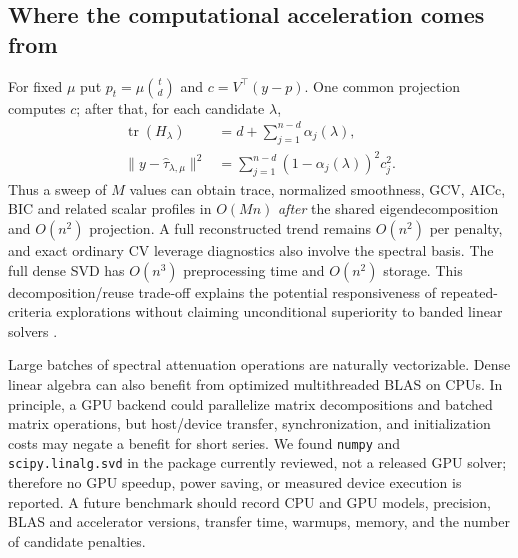 \subsection{Where the computational acceleration comes from}
For fixed $\mu$ put $p_t=\mu\binom td$ and
$c=V^\top(y-p)$. One common projection computes $c$; after
that, for each candidate $\lambda$,
\begin{align}\label{eq:fast-profiles}
\operatorname{tr}(H_\lambda)&=d+\sum_{j=1}^{n-d}\alpha_j(\lambda),\\
\|y-\widehat{\tau}_{\lambda,\mu}\|^2
&=\sum_{j=1}^{n-d}(1-\alpha_j(\lambda))^2c_j^2.
\end{align}
Thus a sweep of $M$ values can obtain trace, normalized smoothness,
GCV, AICc, BIC and related scalar profiles in $O(Mn)$
\emph{after} the shared eigendecomposition and $O(n^2)$
projection. A full reconstructed trend remains $O(n^2)$ per
penalty, and exact ordinary CV leverage diagnostics also involve
the spectral basis. The full dense SVD has $O(n^3)$
preprocessing time and $O(n^2)$ storage. This decomposition/reuse
trade-off explains the potential responsiveness of repeated-criteria
explorations without claiming unconditional superiority to
banded linear solvers \cite{weinert2007wh,biessy2026wh}.

Large batches of spectral attenuation operations are naturally
vectorizable. Dense linear algebra can also benefit from optimized
multithreaded BLAS on CPUs. In principle, a GPU backend could
parallelize matrix decompositions and batched matrix operations,
but host/device transfer, synchronization, and initialization
costs may negate a benefit for short series. We found
\texttt{numpy} and \texttt{scipy.linalg.svd} in the package
currently reviewed, not a released GPU solver; therefore no GPU
speedup, power saving, or measured device execution is reported.
A future benchmark should record CPU and GPU models, precision,
BLAS and accelerator versions, transfer time, warmups, memory, and
the number of candidate penalties.
